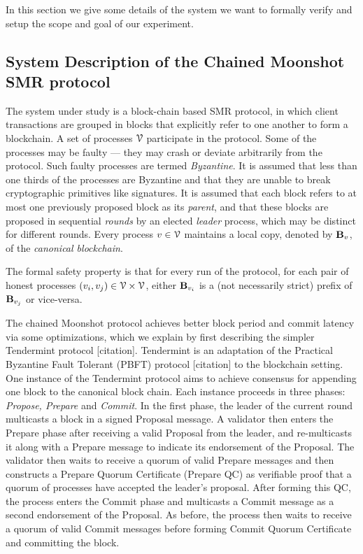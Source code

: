 In this section we give some details of the system we want to formally verify and setup the scope and goal of our experiment.

\subsection{System Description of the Chained Moonshot SMR protocol}
The system under study is a block-chain based SMR protocol, in which client transactions are grouped in blocks that explicitly refer to one another to form a blockchain. A set of processes $\mathcal{V}$ participate in the protocol. Some of the processes may be faulty --- they may crash or deviate arbitrarily from the protocol. Such faulty processes are termed \emph{Byzantine}. It is assumed that less than one thirds of the processes are Byzantine and that they are unable to break cryptographic primitives like signatures. It is assumed that each block refers to at most one previously proposed block as its \emph{parent}, and that these blocks are proposed in sequential \emph{rounds} by an elected \emph{leader} process, which may be distinct for different rounds. Every process $v \in \mathcal{V}$ maintains a local copy, denoted by $\mathbf{B}_v$, of the \emph{canonical blockchain}.

The formal safety property is that for every run of the protocol, for each pair of honest processes $(v_i,v_j) \in \mathcal{V} \times \mathcal{V}$, either $\mathbf{B}_{v_i}$ is a (not necessarily strict) prefix of $\mathbf{B}_{v_j}$ or vice-versa.

The chained Moonshot protocol achieves better block period and commit latency via some optimizations, which we explain by first describing the simpler Tendermint protocol [citation]. Tendermint is an adaptation of the Practical Byzantine Fault Tolerant (PBFT) protocol [citation] to the blockchain setting. One instance of the Tendermint protocol aims to achieve consensus for appending one block to the canonical block chain. Each instance proceeds in three phases: \emph{Propose, Prepare} and \emph{Commit}. In the first phase, the leader of the current round multicasts a block in a signed Proposal message. A validator then enters the Prepare phase after receiving a valid Proposal from the leader, and re-multicasts it along with a Prepare message to indicate its endorsement of the Proposal. The validator then waits to receive a quorum of valid Prepare messages and then constructs a Prepare Quorum Certificate (Prepare QC) as verifiable proof that a quorum of processes have accepted the leader’s proposal. After forming this QC, the process enters the Commit phase and multicasts a Commit message as a second endorsement of the Proposal. As before, the process then waits to receive a quorum of valid Commit messages before forming Commit Quorum Certificate and committing the block.


